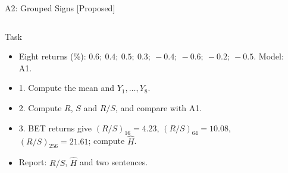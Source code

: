 \begin{frame}{A2: Grouped Signs [Proposed]}
\propsub
\itemsize{\scriptsize}
\begin{columns}[T]
\begin{column}{\taskw}
\begin{block}{Task}
\begin{itemize}
    \item Eight returns (\%): $0.6;\ 0.4;\ 0.5;\ 0.3;\ -0.4;\ -0.6;\ -0.2;\ -0.5$. Model: A1.
    \item 1. Compute the mean and $Y_1, \dots, Y_8$.
    \item 2. Compute $R$, $S$ and $R/S$, and compare with A1.
    \item 3. BET returns give $(R/S)_{16} = 4.23$, $(R/S)_{64} = 10.08$, $(R/S)_{256} = 21.61$; compute $\hat H$.
    \item Report: $R/S$, $\hat H$ and two sentences.
\end{itemize}
\end{block}
\end{column}
\begin{column}{\solw}
\end{column}
\end{columns}
\end{frame}

